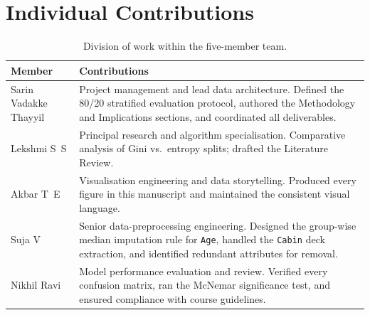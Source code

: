 \documentclass[10pt,a4paper,twocolumn]{article}
\begin{document}
\section{Individual Contributions}\label{sec:contrib}
\begin{table}[H]
\centering\small
\caption{Division of work within the five-member team.}
\label{tab:contrib}
\begin{tabular}{@{}p{}p{}@{}}
\toprule
Member & Contributions \\
\midrule
Sarin Vadakke Thayyil & Project management and lead data architecture. Defined the 80/20
stratified evaluation protocol, authored the Methodology and Implications sections, and
coordinated all deliverables. \\
\addlinespace
Lekshmi S~S & Principal research and algorithm specialisation. Comparative analysis of
Gini vs.\ entropy splits; drafted the Literature Review. \\
\addlinespace
Akbar T~E & Visualisation engineering and data storytelling. Produced every figure in
this manuscript and maintained the consistent visual language. \\
\addlinespace
Suja V & Senior data-preprocessing engineering. Designed the group-wise median imputation
rule for \texttt{Age}, handled the \texttt{Cabin} deck extraction, and identified
redundant attributes for removal. \\
\addlinespace
Nikhil Ravi & Model performance evaluation and review. Verified every confusion matrix,
ran the McNemar significance test, and ensured compliance with course guidelines. \\
\bottomrule
\end{tabular}
\end{table}

\vfill\null\newpage
\end{document}

